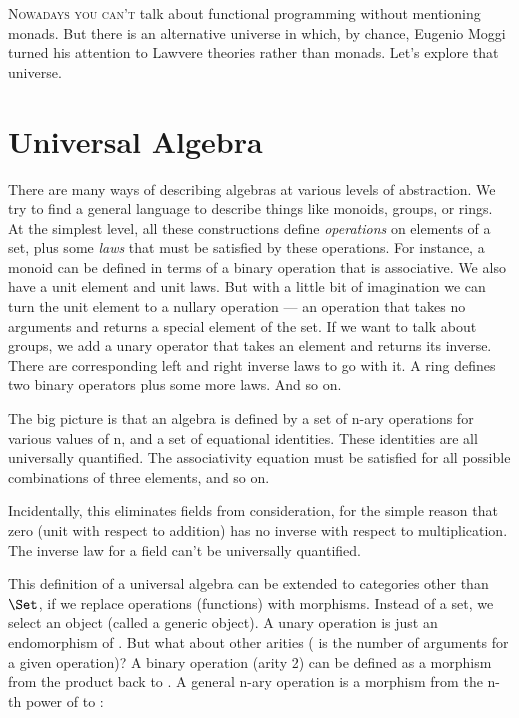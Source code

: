\lettrine[lhang=0.17]{N}{owadays you can't} talk about functional programming without mentioning
monads. But there is an alternative universe in which, by chance,
Eugenio Moggi turned his attention to Lawvere theories rather than
monads. Let's explore that universe.

\section{Universal Algebra}\label{universal-algebra}

There are many ways of describing algebras at various levels of
abstraction. We try to find a general language to describe things like
monoids, groups, or rings. At the simplest level, all these
constructions define \emph{operations} on elements of a set, plus some
\emph{laws} that must be satisfied by these operations. For instance, a
monoid can be defined in terms of a binary operation that is
associative. We also have a unit element and unit laws. But with a
little bit of imagination we can turn the unit element to a nullary
operation --- an operation that takes no arguments and returns a special
element of the set. If we want to talk about groups, we add a unary
operator that takes an element and returns its inverse. There are
corresponding left and right inverse laws to go with it. A ring defines
two binary operators plus some more laws. And so on.

The big picture is that an algebra is defined by a set of n-ary
operations for various values of n, and a set of equational identities.
These identities are all universally quantified. The associativity
equation must be satisfied for all possible combinations of three
elements, and so on.

Incidentally, this eliminates fields from consideration, for the simple
reason that zero (unit with respect to addition) has no inverse with
respect to multiplication. The inverse law for a field can't be
universally quantified.

This definition of a universal algebra can be extended to categories
other than $\Set$, if we replace operations (functions) with
morphisms. Instead of a set, we select an object  (called a
generic object). A unary operation is just an endomorphism of
. But what about other arities ( is the number of
arguments for a given operation)? A binary operation (arity 2) can be
defined as a morphism from the product  back to .
A general n-ary operation is a morphism from the n-th power of
 to :

